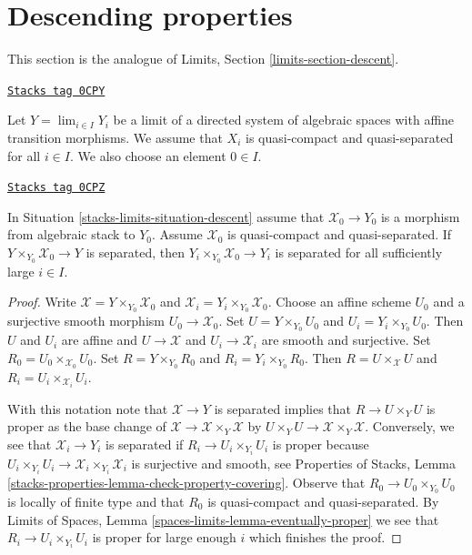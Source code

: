 \section{Descending properties}
\label{stacks-limits-section-descent}
This section is the analogue of Limits, Section \ref{limits-section-descent}.

\begin{definition}
\label{stacks-limits-situation-descent}
\href{https://stacks.math.columbia.edu/tag/0CPY}{\texttt{Stacks tag 0CPY}}

Let $Y = \lim_{i \in I} Y_i$ be a limit of a directed
system of algebraic spaces with affine transition morphisms.
We assume that $X_i$ is quasi-compact and quasi-separated for all $i \in I$.
We also choose an element $0 \in I$.
\end{definition}

\begin{lemma}
\label{stacks-limits-lemma-eventually-separated}
\href{https://stacks.math.columbia.edu/tag/0CPZ}{\texttt{Stacks tag 0CPZ}}

In Situation \ref{stacks-limits-situation-descent} assume that $\mathcal{X}_0 \to Y_0$
is a morphism from algebraic stack to $Y_0$. Assume $\mathcal{X}_0$
is quasi-compact and quasi-separated.
If $Y \times_{Y_0} \mathcal{X}_0 \to Y$ is separated, then
$Y_i \times_{Y_0} \mathcal{X}_0 \to Y_i$ is separated for all
sufficiently large $i \in I$.
\end{lemma}

\begin{proof}
Write $\mathcal{X} = Y \times_{Y_0} \mathcal{X}_0$ and
$\mathcal{X}_i = Y_i \times_{Y_0} \mathcal{X}_0$.
Choose an affine scheme $U_0$ and a surjective smooth morphism
$U_0 \to \mathcal{X}_0$. Set $U = Y \times_{Y_0} U_0$
and $U_i = Y_i \times_{Y_0} U_0$. Then $U$ and $U_i$ are
affine and $U \to \mathcal{X}$ and $U_i \to \mathcal{X}_i$
are smooth and surjective. Set $R_0 = U_0 \times_{\mathcal{X}_0} U_0$.
Set $R = Y \times_{Y_0} R_0$ and $R_i = Y_i \times_{Y_0} R_0$.
Then $R = U \times_\mathcal{X} U$ and $R_i = U_i \times_{\mathcal{X}_i} U_i$.

\medskip\noindent
With this notation note that $\mathcal{X} \to Y$ is separated
implies that $R \to U \times_Y U$ is proper as the base change
of $\mathcal{X} \to \mathcal{X} \times_Y \mathcal{X}$
by $U \times_Y U \to \mathcal{X} \times_Y \mathcal{X}$.
Conversely, we see that $\mathcal{X}_i \to Y_i$ is separated
if $R_i \to U_i \times_{Y_i} U_i$ is proper because
$U_i \times_{Y_i} U_i \to \mathcal{X}_i \times_{Y_i} \mathcal{X}_i$
is surjective and smooth, see
Properties of Stacks, Lemma
\ref{stacks-properties-lemma-check-property-covering}.
Observe that $R_0 \to U_0 \times_{Y_0} U_0$
is locally of finite type and that $R_0$ is
quasi-compact and quasi-separated.
By Limits of Spaces, Lemma \ref{spaces-limits-lemma-eventually-proper}
we see that $R_i \to U_i \times_{Y_i} U_i$ is
proper for large enough $i$ which finishes the proof.
\end{proof}


